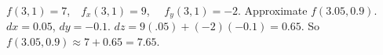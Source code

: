 {$f(3,1) = 7$,\ \  $f_x(3,1) = 9$, \ \ $f_y(3,1) = -2$.  Approximate $f(3.05, 0.9)$. 
}
{$dx = 0.05$, $dy = -0.1$. $dz = 9(.05)+(-2)(-0.1) = 0.65$. So $f(3.05,0.9) \approx 7+0.65=7.65$.
}